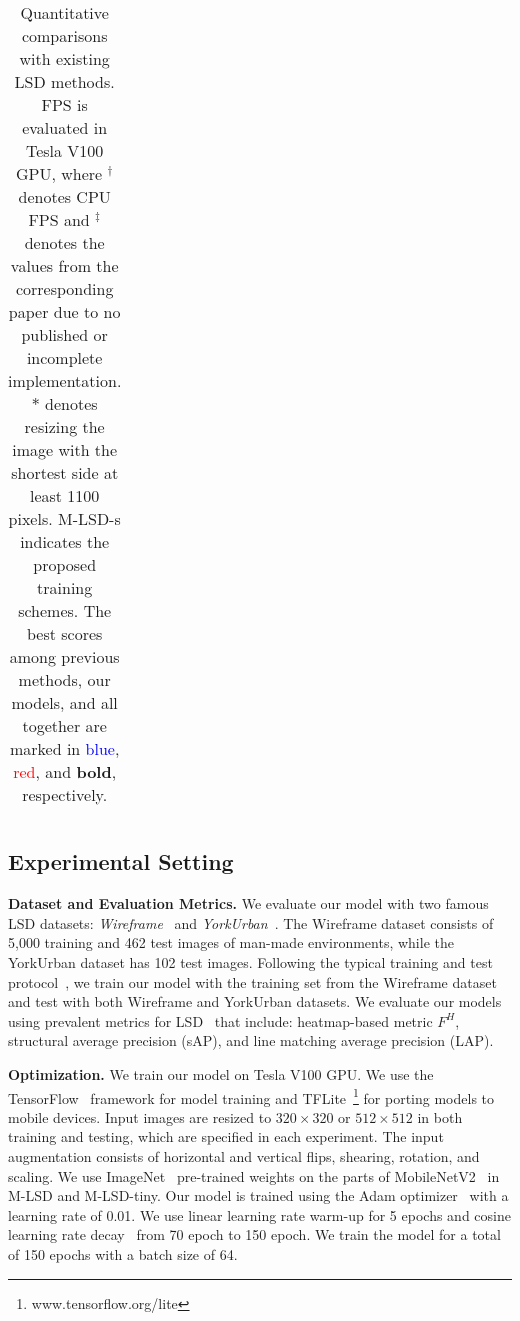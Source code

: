 \documentclass[letterpaper]{article} \usepackage{aaai22}  \usepackage{times}  \usepackage{helvet}  \usepackage{courier}  \usepackage[hyphens]{url}  \usepackage{graphicx} \urlstyle{rm} \def\UrlFont{\rm}  \usepackage{natbib}  \usepackage{caption} \DeclareCaptionStyle{ruled}{labelfont=normalfont,labelsep=colon,strut=off} \frenchspacing  \setlength{\pdfpagewidth}{8.5in}  \setlength{\pdfpageheight}{11in}  \usepackage{algorithm}
\begin{document}
\begin{table*}[t!]
\begin{adjustbox}{width=0.8\textwidth,center}
\begin{tabular}{lcccccccccccc}
\bottomrule
\end{tabular}
\end{adjustbox}
\caption{Quantitative comparisons with existing LSD methods. FPS is evaluated in Tesla V100 GPU, where $^{\dagger}$ denotes CPU FPS and $^{\ddagger}$ denotes the values from the corresponding paper due to no published or incomplete implementation. $\ast$ denotes resizing the image with the shortest side at least 1100 pixels. M-LSD-s indicates the proposed training schemes. The best scores among previous methods, our models, and all together are marked in \textcolor{blue}{blue}, \textcolor{red}{red}, and \textbf{bold}, respectively.}
\label{table:sota}
\end{table*}

\subsection{Experimental Setting}
\textbf{Dataset and Evaluation Metrics. }
We evaluate our model with two famous LSD datasets: \textit{Wireframe}~\cite{huang2018learning} and \textit{YorkUrban}~\cite{denis2008efficient}.
The Wireframe dataset consists of 5,000 training and 462 test images of man-made environments, while the YorkUrban dataset has 102 test images.
Following the typical training and test protocol~\cite{huang2020tp,zhou2019end}, we train our model with the training set from the Wireframe dataset and test with both Wireframe and YorkUrban datasets.
We evaluate our models using prevalent metrics for LSD~\cite{huang2020tp,zhang2019ppgnet,meng2020lgnn,xue2019learning,zhou2019end} that include: heatmap-based metric $F^H$, structural average precision (sAP), and line matching average precision (LAP).

\textbf{Optimization. }
We train our model on Tesla V100 GPU.
We use the TensorFlow~\cite{abadi2016tensorflow} framework for model training and TFLite~\footnote{www.tensorflow.org/lite} for porting models to mobile devices.
Input images are resized to $320 \times 320$ or $512 \times 512$ in both training and testing, which are specified in each experiment.
The input augmentation consists of horizontal and vertical flips, shearing, rotation, and scaling.
We use ImageNet~\cite{deng2009imagenet} pre-trained weights on the parts of MobileNetV2~\cite{sandler2018mobilenetv2} in M-LSD and M-LSD-tiny.
Our model is trained using the Adam optimizer~\cite{kingma2014adam} with a learning rate of 0.01.
We use linear learning rate warm-up for 5 epochs and cosine learning rate decay~\cite{loshchilov2016sgdr} from 70 epoch to 150 epoch.
We train the model for a total of 150 epochs with a batch size of 64.
\end{document}
